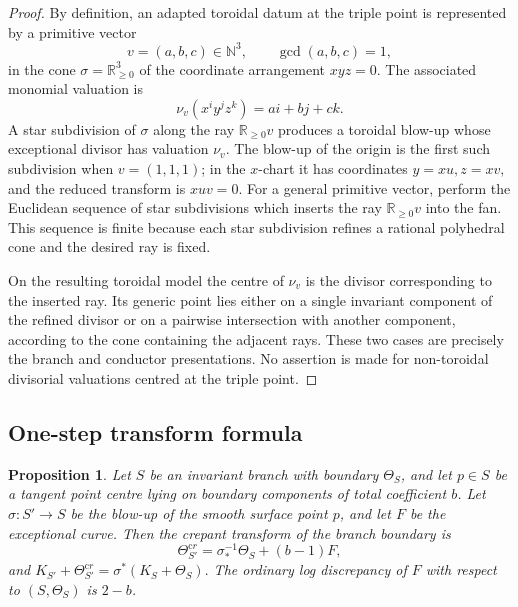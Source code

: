 \documentclass[11pt]{amsart}
\numberwithin{equation}{section}
\theoremstyle{plain}
\newtheorem{Proposition}[Theorem]{Proposition}
\theoremstyle{definition}
\newcommand{\bN}{\mathbb N}
\newcommand{\bR}{\mathbb R}
\begin{document}
\begin{proof}
By definition, an adapted toroidal datum at the triple point is represented by a primitive vector
\[
v=(a,b,c)\in\bN^3,
\qquad \gcd(a,b,c)=1,
\]
in the cone $\sigma=\bR_{\ge0}^3$ of the coordinate arrangement $xyz=0$.  The associated monomial valuation is
\[
\nu_v(x^iy^jz^k)=ai+bj+ck.
\]
A star subdivision of $\sigma$ along the ray $\bR_{\ge0}v$ produces a toroidal blow-up whose exceptional divisor has valuation $\nu_v$.  The blow-up of the origin is the first such subdivision when $v=(1,1,1)$; in the $x$-chart it has coordinates
$
y=xu, z=xv,
$
and the reduced transform is $xuv=0$.  For a general primitive vector, perform the Euclidean sequence of star subdivisions which inserts the ray $\bR_{\ge0}v$ into the fan.  This sequence is finite because each star subdivision refines a rational polyhedral cone and the desired ray is fixed.

On the resulting toroidal model the centre of $\nu_v$ is the divisor corresponding to the inserted ray.  Its generic point lies either on a single invariant component of the refined divisor or on a pairwise intersection with another component, according to the cone containing the adjacent rays.  These two cases are precisely the branch and conductor presentations.  No assertion is made for non-toroidal divisorial valuations centred at the triple point.
\end{proof}

\subsection{One-step transform formula}

\begin{Proposition}
\label{prop:one-step-full}
Let $S$ be an invariant branch with boundary $\Theta_S$, and let $p\in S$ be a tangent point centre lying on boundary components of total coefficient $b$.  Let $\sigma:S'\to S$ be the blow-up of the smooth surface point $p$, and let $F$ be the exceptional curve.  Then the crepant transform of the branch boundary is
\[
\Theta_{S'}^{\mathrm cr}=\sigma^{-1}_*\Theta_S+(b-1)F,
\]
and
$
K_{S'}+\Theta_{S'}^{\mathrm cr}=\sigma^*(K_S+\Theta_S).
$
The ordinary log discrepancy of $F$ with respect to $(S,\Theta_S)$ is $2-b$.
\end{Proposition}
\end{document}

